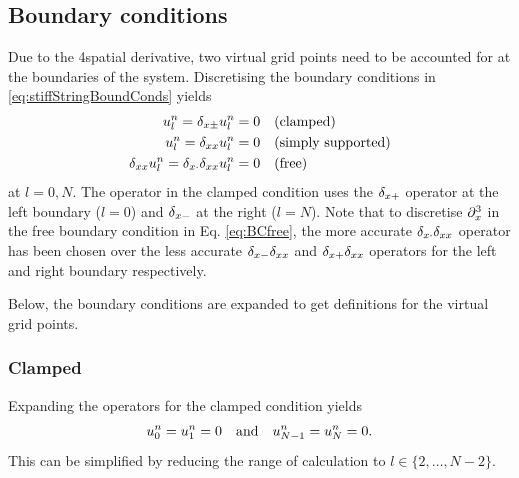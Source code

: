 \subsection{Boundary conditions}\label{sec:stiffStringBoundaryConditions}
Due to the 4\thOrder spatial derivative, two virtual grid points need to be accounted for at the boundaries of the system. Discretising the boundary conditions in \eqref{eq:stiffStringBoundConds} yields
\begin{subequations}\label{eq:stiffStringBoundCondsDisc}
    \begin{align}
        u_l^n = \delta_{x\pm} u_l^n &= 0 \quad \text{(clamped)}\label{eq:BCclampedDisc}\\
        u_l^n = \delta_{xx} u_l^n &= 0 \quad \text{(simply supported)}\label{eq:BCsimplySupportedDisc}\\
        \delta_{xx} u_l^n = \delta_{x\cdot}\delta_{xx} u_l^n &= 0 \quad \text{(free)}\label{eq:BCfreeDisc}
    \end{align}
\end{subequations}
at $l = 0, N$. The operator in the clamped condition uses the $\delta_{x+}$ operator at the left boundary ($l = 0$) and $\delta_{x-}$ at the right ($l = N$). Note that to discretise $\partial_x^3$ in the free boundary condition in Eq. \eqref{eq:BCfree}, the more accurate $\delta_{x\cdot}\delta_{xx}$ operator has been chosen over the less accurate $\delta_{x-} \delta_{xx}$ and $\delta_{x+} \delta_{xx}$ operators for the left and right boundary respectively.

Below, the boundary conditions are expanded to get definitions for the virtual grid points. 


\subsubsection{Clamped}
Expanding the operators for the clamped condition yields 
\begin{equation}
    u_0^n = u_1^n = 0 \quad \text{and} \quad u_{N-1}^n = u_N^n = 0.
\end{equation}
This can be simplified by reducing the range of calculation to $l\in \{ 2, \hdots, N-2\}$.

